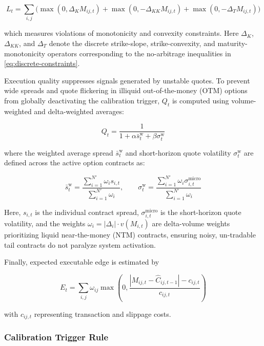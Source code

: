 \documentclass[11pt, a4paper]{article}
\begin{document}
\begin{equation}
L_t
=
\sum_{i,j}
\Big(
\max(0,\Delta_K M_{ij,t})
+
\max(0,-\Delta_{KK} M_{ij,t})
+
\max(0,-\Delta_T M_{ij,t})
\Big)
\end{equation}

which measures violations of monotonicity and convexity constraints. Here $\Delta_K$, $\Delta_{KK}$, and $\Delta_T$ denote the discrete strike-slope, strike-convexity, and maturity-monotonicity operators corresponding to the no-arbitrage inequalities in \eqref{eq:discrete-constraints}.

Execution quality suppresses signals generated by unstable quotes. To prevent wide spreads and quote flickering in illiquid out-of-the-money (OTM) options from globally deactivating the calibration trigger, $Q_t$ is computed using volume-weighted and delta-weighted averages:

\begin{equation}
Q_t
=
\frac{1}
{1+\alpha \bar{s}^{\mathrm{w}}_t+\beta \sigma^{\mathrm{w}}_t}
\end{equation}

where the weighted average spread $\bar{s}^{\mathrm{w}}_t$ and short-horizon quote volatility $\sigma^{\mathrm{w}}_t$ are defined across the active option contracts as:

\begin{equation}
\bar{s}^{\mathrm{w}}_t = \frac{\sum_{i=1}^{N'} \omega_i s_{i,t}}{\sum_{i=1}^{N'} \omega_i}, \qquad \sigma^{\mathrm{w}}_t = \frac{\sum_{i=1}^{N'} \omega_i \sigma^{\mathrm{micro}}_{i,t}}{\sum_{i=1}^{N'} \omega_i}
\end{equation}

Here, $s_{i,t}$ is the individual contract spread, $\sigma^{\mathrm{micro}}_{i,t}$ is the short-horizon quote volatility, and the weights $\omega_i = |\Delta_i| \cdot v(M_{i,t})$ are delta-volume weights prioritizing liquid near-the-money (NTM) contracts, ensuring noisy, un-tradable tail contracts do not paralyze system activation.

Finally, expected executable edge is estimated by

\begin{equation}
E_t
=
\sum_{i,j}
\omega_{ij}
\max
\left(
0,
\frac{
|M_{ij,t}
-
\widehat{C}_{ij,t-1}|
-c_{ij,t}
}
{c_{ij,t}}
\right)
\end{equation}

with \(c_{ij,t}\) representing transaction and slippage costs.

\subsubsection{Calibration Trigger Rule}
\end{document}
